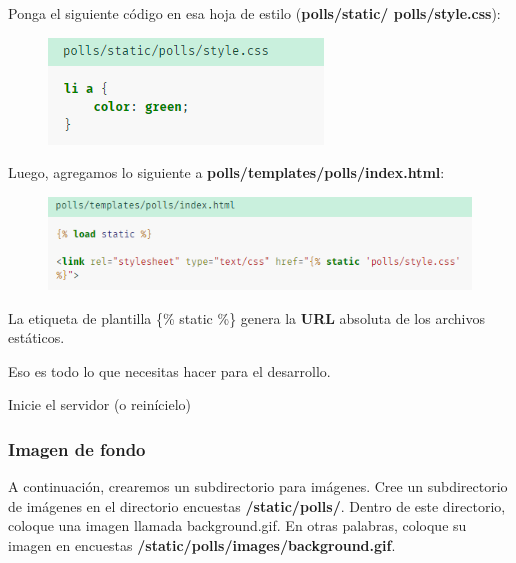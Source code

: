\documentclass[10pt]{article}
\begin{document}
Ponga el siguiente código en esa hoja de estilo (\textbf{polls/static/ polls/style.css}):
\begin{figure}[H]
\begin{center}
\includegraphics[scale=0.8]{figuras/3/36/361/img1.png}
\end{center}
\end{figure}
Luego, agregamos lo siguiente a \textbf{polls/templates/polls/index.html}:
\begin{figure}[H]
\begin{center}
\includegraphics[scale=0.8]{figuras/3/36/361/img2.png}
\end{center}
\end{figure}

La etiqueta de plantilla \textcolor{R}{\{\% static \%\}} genera la \textbf{URL} absoluta de los archivos estáticos.

Eso es todo lo que necesitas hacer para el desarrollo.

Inicie el servidor (o reinícielo)

\subsubsection{Imagen de fondo}
A continuación, crearemos un subdirectorio para imágenes. Cree un subdirectorio de imágenes en el directorio encuestas \textbf{/static/polls/}. Dentro de este directorio, coloque una imagen llamada background.gif. En otras palabras, coloque su imagen en encuestas \textbf{/static/polls/images/background.gif}.
\end{document}
